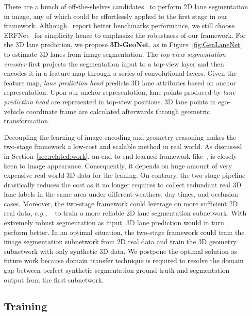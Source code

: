 \documentclass[10pt,twocolumn,letterpaper]{article}
\begin{document}
There are  a  bunch  of  off-the-shelves   candidates~\cite{Romera:etal:ERFNet:TITS2018,ContextNet:2018,Pan:etal:AAAI2018,Hou:etal:ICCV2019} to perform 2D lane segmentation in image, any of which could be effortlessly applied to the first stage in our framework. Although~\cite{ContextNet:2018,Pan:etal:AAAI2018} report better benchmarks performance, we still choose ERFNet~\cite{Romera:etal:ERFNet:TITS2018} for simplicity hence to emphasize the robustness of our framework. For the 3D lane prediction, we propose {\bf 3D-GeoNet}, as in Figure~\ref{fig:GenLaneNet} to estimate 3D lanes from image segmentation. The \textit{top-view segmentation encoder} first projects the segmentation input to a top-view layer and then encodes it in a feature map through a series of convolutional layers. Given the feature map, \textit{lane prediction head} predicts 3D lane attributes based on anchor representation. Upon our anchor representation, lane points produced by \textit{lane prediction head} are represented in top-view positions. 3D lane points in ego-vehicle coordinate frame are calculated afterwards through geometric transformation.

Decoupling the learning of image encoding and geometry reasoning makes the two-stage framework a low-cost and scalable method in real world. As discussed in Section~\ref{sec:related:work}, an end-to-end learned framework like~\cite{Garnett:etal:ICCV2019}, is closely keen to image appearance. Consequently, it depends on huge amount of very expensive real-world 3D data for the leaning. On contrary, the two-stage pipeline drastically reduces the cost as it no longer requires to collect redundant real 3D lane labels in the same area under different weathers, day times, and occlusion cases. Moreover, the two-stage framework could leverage on more sufficient 2D real data, {\it e.g.,} ~\cite{CityScapes2016,Tusimple2018,Pan:etal:AAAI2018} to train a more reliable 2D lane segmentation subnetwork. With extremely robust segmentation as input, 3D lane prediction would in turn perform better. In an optimal situation, the two-stage framework could train the image segmentation subnetwork from 2D real data and train the 3D geometry subnetwork with only synthetic 3D data. We postpone the optimal solution as future work because domain transfer technique is required to resolve the domain gap between perfect synthetic segmentation ground truth and segmentation output from the first subnetwork.






\subsection{Training}
\end{document}
